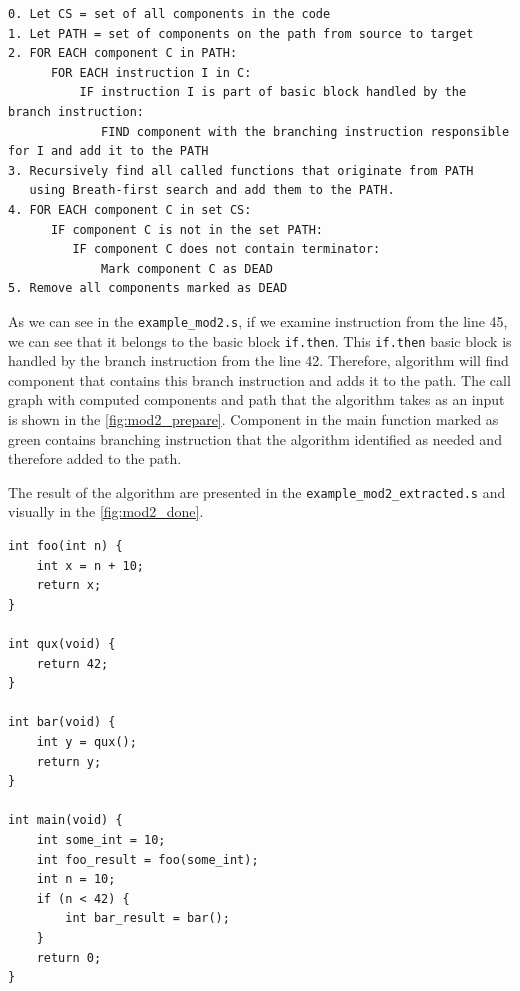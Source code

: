 \documentclass[12pt, twoside]{fithesis2}
\renewcommand{\_}{\leavevmode \kern0.07em\vbox{\hrule width0.4em}}
\begin{document}
\begin{verbatim}
0. Let CS = set of all components in the code
1. Let PATH = set of components on the path from source to target
2. FOR EACH component C in PATH:
      FOR EACH instruction I in C:
          IF instruction I is part of basic block handled by the branch instruction:
             FIND component with the branching instruction responsible for I and add it to the PATH
3. Recursively find all called functions that originate from PATH
   using Breath-first search and add them to the PATH.
4. FOR EACH component C in set CS:
      IF component C is not in the set PATH:
         IF component C does not contain terminator:
             Mark component C as DEAD
5. Remove all components marked as DEAD
\end{verbatim}

As we can see in the
\texttt{example_mod2.s}, if we examine instruction from the line 45,
we can see that it belongs to the basic block
\texttt{if.then}. This \texttt{if.then} basic block is
handled by the branch instruction from the line 42. Therefore, algorithm will
find component that contains this branch instruction and adds it to the path.
The call graph with computed components and path that the algorithm takes as
an input is shown in the \autoref{fig:mod2_prepare}.
Component in the main function marked as green contains branching instruction
that the algorithm identified as needed and therefore added to the path.

The result of the algorithm are presented in the
\texttt{example_mod2_extracted.s} and visually in the
\autoref{fig:mod2_done}.


\begin{verbatim}
int foo(int n) {
    int x = n + 10;
    return x;
}

int qux(void) {
    return 42;
}

int bar(void) {
    int y = qux();
    return y;
}

int main(void) {
    int some_int = 10;
    int foo_result = foo(some_int);
    int n = 10;
    if (n < 42) {
        int bar_result = bar();
    }
    return 0;
}
\end{verbatim}

\end{document}
